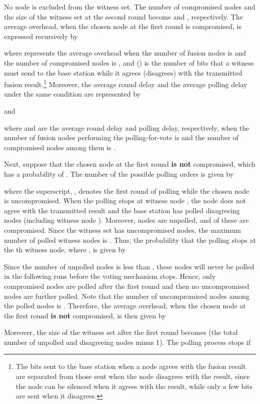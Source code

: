 \documentclass[12pt, onecolumn, draftcls]{IEEEtran}
\begin{document}
No node is excluded from the witness set. The number of compromised
nodes and the size of the witness set at the second round become
 and , respectively. The average overhead, when the chosen
node at the first round is compromised, is expressed recursively by

where  represents the average overhead when the
number of fusion nodes is  and the number of compromised nodes
is , and  () is the number of bits that a
witness must send to the base station while it agrees (disagrees)
with the transmitted fusion result.\footnote{The bits sent to the
base station when a node agrees with the fusion result are separated
from those sent when the node disagrees with the result, since the
node can be silenced when it agrees with the result, while only a
few bits are sent when it disagrees.} Moreover, the average round
delay and the average polling delay under the same condition are
represented by

and

where  and  are the
average round delay and polling delay, respectively, when the number
of fusion nodes performing the polling-for-vote is  and the
number of compromised nodes among them is .

Next, suppose that the chosen node at the first round {\bf is  not}
compromised, which has a probability of . The number of the
possible polling orders is given by

where the superscript, , denotes the first round of polling
while the chosen node is uncompromised. When the polling stops at
witness node , the node does not agree with the transmitted
result and the base station has polled  disagreeing nodes
(including witness node ). Moreover,  nodes are unpolled,
and  of these are compromised. Since the witness set
has  uncompromised nodes, the maximum number of polled
witness nodes is . Thus, the probability that the
polling stops at the th witness node, where , is given by


Since the number of unpolled nodes  is less than , these
nodes will never be polled in the following runs before the voting
mechanism stops. Hence, only compromised nodes are polled after the
first round  and then no uncompromised nodes are further polled.
Note that the number of uncompromised nodes among the polled nodes
is . Therefore, the average overhead, when the chosen
node at the first round {\bf is not} compromised, is then given by

Moreover, the size of the witness set after the first round becomes
 (the total number of unpolled
and disagreeing nodes minus 1). The polling process stops if
\end{document}
